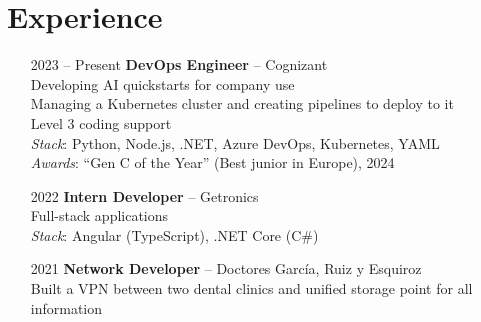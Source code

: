 \section*{Experience}
\begin{itemize}
    \setlength\itemsep{0.3em}
    \item[2023 -- Present] \textbf{DevOps Engineer} -- Cognizant\\
    Developing AI quickstarts for company use\\
    Managing a Kubernetes cluster and creating pipelines to deploy to it\\
    Level 3 coding support\\
    \emph{Stack}: Python, Node.js, .NET, Azure DevOps, Kubernetes, YAML\\
    \emph{Awards}: ``Gen C of the Year'' (Best junior in Europe), 2024
    \item[2022] \textbf{Intern Developer} -- Getronics\\
    Full-stack applications\\
    \emph{Stack}: Angular (TypeScript), .NET Core (C\#)
    \item[2021] \textbf{Network Developer} -- Doctores Garc\'ia, Ruiz y Esquiroz\\
    Built a VPN between two dental clinics and unified storage point for all information
\end{itemize}

